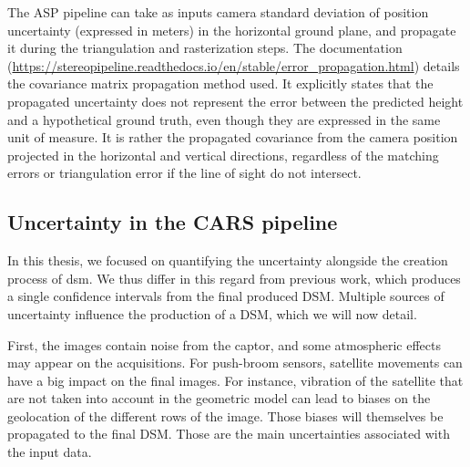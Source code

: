 The ASP pipeline can take as inputs camera standard deviation of position uncertainty (expressed in meters) in the horizontal ground plane, and propagate it during the triangulation and rasterization steps. The documentation (\url{https://stereopipeline.readthedocs.io/en/stable/error_propagation.html}) details the covariance matrix propagation method used. It explicitly states that the propagated uncertainty does not represent the error between the predicted height and a hypothetical ground truth, even though they are expressed in the same unit of measure. It is rather the propagated covariance from the camera position projected in the horizontal and vertical directions, regardless of the matching errors or triangulation error if the line of sight do not intersect.

\subsection{Uncertainty in the CARS pipeline}\label{sec:uncertainty_cars}
In this thesis, we focused on quantifying the uncertainty alongside the creation process of \acrshort{dsm}. We thus differ in this regard from previous work, which produces a single confidence intervals from the final produced DSM. Multiple sources of uncertainty influence the production of a DSM, which we will now detail.

First, the images contain noise from the captor, and some atmospheric effects may appear on the acquisitions. For push-broom sensors, satellite movements can have a big impact on the final images. For instance, vibration of the satellite that are not taken into account in the geometric model can lead to biases on the geolocation of the different rows of the image. Those biases will themselves be propagated to the final DSM. Those are the main uncertainties associated with the input data.

